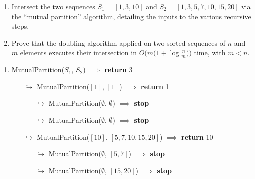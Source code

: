 \exercise

\begin{enumerate}

  \item Intersect the two sequences $S_1 = [1, 3, 10]$ and $S_2 = [1, 3, 5, 7,
  10, 15, 20]$ via the ``mutual partition'' algorithm, detailing the inputs to
  the various recursive steps.

  \item Prove that the doubling algorithm applied on two sorted sequences of $n$
  and $m$ elements executes their intersection in $O\big(m \big(1 + \log
  \frac{n}{m}\big)\big)$ time, with $m < n$.

\end{enumerate}

\solution

\begin{enumerate}
  \item {\sc MutualPartition($S_1$, $S_2$)} $\implies$ {\bf return} 3
    \begin{itemize}[topsep=-0.1em]
      \item[$\hookrightarrow$] {\sc MutualPartition($[1]$, $[1]$)} $\implies$ {\bf return} 1
        \begin{itemize}
          \item[$\hookrightarrow$] {\sc MutualPartition($\emptyset$, $\emptyset$)} $\implies$ {\bf stop}
          \item[$\hookrightarrow$] {\sc MutualPartition($\emptyset$, $\emptyset$)} $\implies$ {\bf stop}
        \end{itemize}
      \item[$\hookrightarrow$] {\sc MutualPartition($[10]$, $[5, 7, 10, 15, 20]$)} $\implies$ {\bf return} 10
        \begin{itemize}
          \item[$\hookrightarrow$] {\sc MutualPartition($\emptyset$, $[5, 7]$)} $\implies$ {\bf stop}
          \item[$\hookrightarrow$] {\sc MutualPartition($\emptyset$, $[15, 20]$)} $\implies$ {\bf stop}
        \end{itemize}
    \end{itemize}


\end{enumerate}
